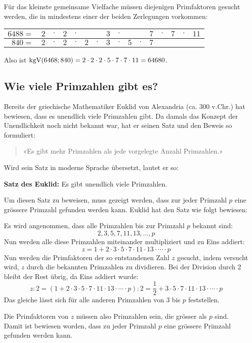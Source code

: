 Für das kleinste gemeinsame Vielfache müssen diejenigen Primfaktoren gesucht werden, die in mindestens einer der beiden Zerlegungen vorkommen:
\begin{center}
  \renewcommand{\arraystretch}{1.3}
  \begin{tabular}{rccccccccccccccc}
    \hline
      $6488=$ & \cellcolor{lightgreen} $2$ & $\cdot$ & \cellcolor{lightgreen} $2$ & $\cdot$ & & & \cellcolor{lightgreen} $3$ & $\cdot$ & & & \cellcolor{lightgreen} $7$ & $\cdot$ & \cellcolor{lightgreen} $7$ & $\cdot$ & \cellcolor{lightgreen} $11$ \\
    \hline
       $840=$ & $2$ & $\cdot$ & $2$ & $\cdot$ & \cellcolor{lightgreen} $2$ & $\cdot$ & $3$ & $\cdot$ & \cellcolor{lightgreen} $5$ & $\cdot$ & $7$ & & & & \\
    \hline
  \end{tabular}
\end{center}
Also ist $\operatorname{kgV}(6468;840) = 2\cdot2\cdot2\cdot5\cdot7\cdot7\cdot11 = 64680$.

\subsection{Wie viele Primzahlen gibt es?}

Bereits der griechische Mathematiker Euklid von Alexandria (ca. 300 v.Chr.) hat bewiesen, dass es unendlich viele Primzahlen gibt. Da damals das Konzept der Unendlichkeit noch nicht bekannt war, hat er seinen Satz und den Beweis so formuliert:

\begin{quote}
  «Es gibt mehr Primzahlen als jede vorgelegte Anzahl Primzahlen.»
\end{quote}

Wird sein Satz in moderne Sprache übersetzt, lautet er so:
\begin{theorem}
  \textbf{Satz des Euklid:} Es gibt unendlich viele Primzahlen.
\end{theorem}

Um diesen Satz zu beweisen, muss gezeigt werden, dass zur jeder Primzahl $p$ eine grössere Primzahl gefunden werden kann. Euklid hat den Satz wie folgt bewiesen:

Es wird angenommen, dass alle Primzahlen bis zur Primzahl $p$ bekannt sind:
\[
  2, 3, 5, 7, 11, 13, \ldots, p
\]
Nun werden alle diese Primzahlen miteinander multipliziert und zu Eins addiert:
\[
  z = 1 + 2\cdot 3\cdot 5\cdot 7\cdot 11\cdot 13\cdot\cdots\cdot p
\]
Nun werden die Primfaktoren der so entstandenen Zahl $z$ gesucht, indem versucht wird, $z$ durch die bekannten Primzahlen zu dividieren. Bei der Division durch 2 bleibt der Rest übrig, da Eins addiert wurde:
\[
  z:2 = (1 + 2\cdot 3\cdot 5\cdot 7\cdot 11\cdot 13\cdot\cdots\cdot p):2 = \frac{1}{2}+ 3\cdot 5\cdot 7\cdot 11\cdot 13\cdot\cdots\cdot p
\]
Das gleiche lässt sich für alle anderen Primzahlen von 3 bis $p$ feststellen.

Die Primfaktoren von $z$ müssen also Primzahlen sein, die grösser als $p$ sind. Damit ist bewiesen worden, dass zu jeder Primzahl $p$ eine grössere Primzahl gefunden werden kann.

